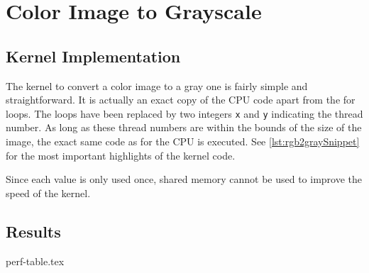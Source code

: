 \documentclass[final]{report}
\begin{document}
\chapter{Color Image to Grayscale}

\section{Kernel Implementation}\label{sec:rgb2gray}
The kernel to convert a color image to a gray one is fairly simple and straightforward.
It is actually an exact copy of the CPU code apart from the for loops.
The loops have been replaced by two integers \texttt{x} and \texttt{y} indicating the thread number.
As long as these thread numbers are within the bounds of the size of the image, the exact same code as for the CPU is executed.
See \cref{lst:rgb2graySnippet} for the most important highlights of the kernel code.


Since each value is only used once, shared memory cannot be used to improve the speed of the kernel.


\section{Results}
{perf-table.tex}
\end{document}
